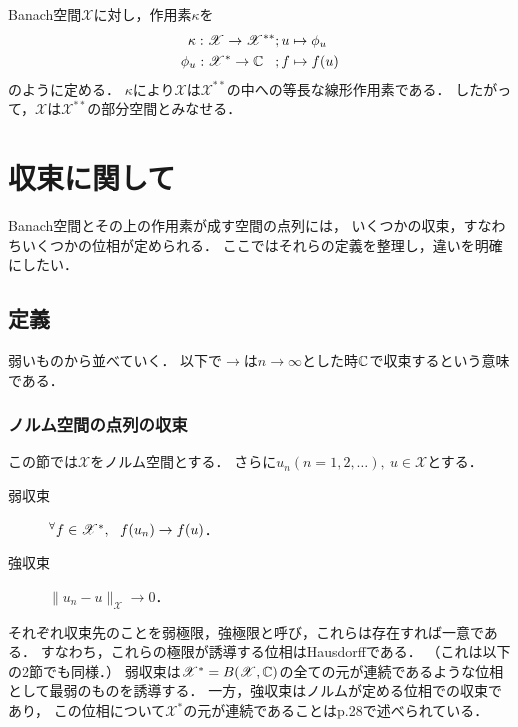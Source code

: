 \documentclass[a4j]{jsarticle}
\newcommand{\spX}{\mathscr{X}}
\begin{document}
    \begin{Them}[定理8.23, p.189] \label{them8:23}
        Banach空間$\spX$に対し，作用素$\kappa$を
        \begin{align*}
            \kappa: \spX \to \spX^{\ast \ast}     &;u \mapsto \phi_{u} \\
            \phi_u: \mathscr{X^{\ast}} \to \C \hspace{3truemm}&;f \mapsto f(u)
        \end{align*}
        のように定める．
        $\kappa$により$\spX$は$\spX^{\ast \ast}$の中への等長な線形作用素である．
        したがって，$\spX$は$\spX^{\ast \ast}$の部分空間とみなせる．
    \end{Them}

    \section{収束に関して}
    Banach空間とその上の作用素が成す空間の点列には，
    いくつかの収束，すなわちいくつかの位相が定められる．
    ここではそれらの定義を整理し，違いを明確にしたい．
    \subsection{定義}
    弱いものから並べていく．
    以下で$\to$は$n \to \infty$とした時$\mathbb{C}$で収束するという意味である．
    \newpage
    \subsubsection{ノルム空間の点列の収束}
    この節では$\spX$をノルム空間とする．
    さらに$u_n (n=1,2,\dots),~ u \in \spX$とする．
    \begin{description}
        \item[弱収束] $\Forall{f \in \spX^*} f(u_n) \to f(u)$．
        \item[強収束] $\|u_n-u\|_{\spX} \to 0$．
    \end{description}
    それぞれ収束先のことを弱極限，強極限と呼び，これらは存在すれば一意である．
    すなわち，これらの極限が誘導する位相はHausdorffである．
    （これは以下の2節でも同様．）
    弱収束は$\spX^*=B(\spX,\C)$の全ての元が連続であるような位相として最弱のものを誘導する．
    一方，強収束はノルムが定める位相での収束であり，
    この位相について$\spX^*$の元が連続であることはp.28で述べられている．
\end{document}
